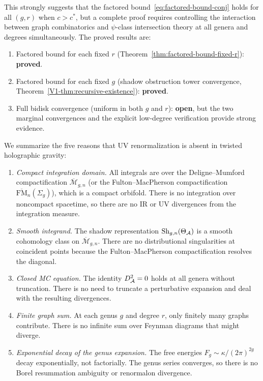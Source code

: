 \begin{remark}
This strongly suggests that the factored
bound~\eqref{eq:factored-bound-conj} holds for all
$(g,r)$ when $c > c^*$, but a complete proof requires
controlling the interaction between graph combinatorics and
$\psi$-class intersection theory at all genera and degrees
simultaneously. The proved results are:
\begin{enumerate}[label=\textup{(\alph*)}]
\item Factored bound for each fixed $r$
 (Theorem~\ref{thm:factored-bound-fixed-r}): \textbf{proved}.
\item Factored bound for each fixed $g$
 (shadow obstruction tower convergence, Theorem~\ref{V1-thm:recursive-existence}):
 \textbf{proved}.
\item Full bidisk convergence (uniform in both $g$ and $r$):
 \textbf{open}, but the two marginal convergences and the
 explicit low-degree verification provide strong evidence.
\end{enumerate}
\end{remark}

\begin{remark}
We summarize the five reasons that UV renormalization is absent in twisted holographic gravity:
\begin{enumerate}[label=\textup{(\arabic*)}]
\item \emph{Compact integration domain.} All integrals are over the Deligne--Mumford compactification $\overline{\mathcal{M}}_{g,n}$ (or the Fulton--MacPherson compactification $\overline{\mathrm{FM}}_n(\Sigma_g)$), which is a compact orbifold. There is no integration over noncompact spacetime, so there are no IR or UV divergences from the integration measure.
\item \emph{Smooth integrand.} The shadow representation $\operatorname{Sh}_{g,n}(\Theta_{\mathcal{A}})$ is a smooth cohomology class on $\overline{\mathcal{M}}_{g,n}$. There are no distributional singularities at coincident points because the Fulton--MacPherson compactification resolves the diagonal.
\item \emph{Closed MC equation.} The identity $D_{\mathcal{A}}^2 = 0$ holds at all genera without truncation. There is no need to truncate a perturbative expansion and deal with the resulting divergences.
\item \emph{Finite graph sum.} At each genus $g$ and degree $r$, only finitely many graphs contribute. There is no infinite sum over Feynman diagrams that might diverge.
\item \emph{Exponential decay of the genus expansion.} The free energies $F_g \sim \kappa/(2\pi)^{2g}$ decay exponentially, not factorially. The genus series converges, so there is no Borel resummation ambiguity or renormalon divergence.
\end{enumerate}
\end{remark}

